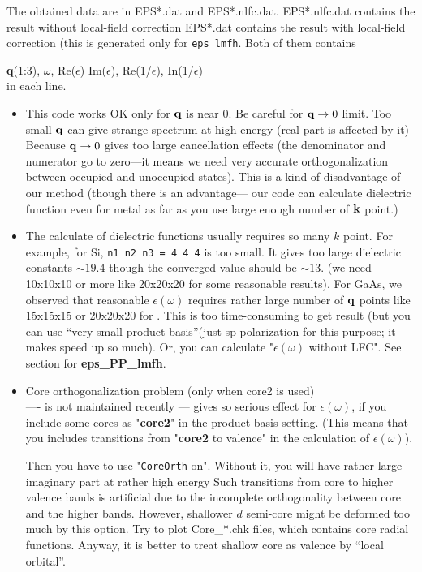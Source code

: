 \documentclass[a4paper,10pt,epsf,fleqn]{article}
\newcommand{\keyw}[1]{\fbox{\tt #1}}
\newcommand{\exe}[1]{{\bf #1}\index{#1}}
\newcommand{\io}[1]{{\sf  #1}\index{#1}}
\newcommand{\raw}[1]{{\tt #1}}
\begin{document}
The obtained data are in {\sf EPS*.dat} and {\sf EPS*.nlfc.dat}.
{\sf EPS*.nlfc.dat} contains the result without local-field correction
{\sf EPS*.dat} contains the result with local-field correction
(this is generated only for \verb#eps_lmfh#. Both of them contains

{\bf q}(1:3), $\omega$, Re($\epsilon$) Im($\epsilon$), Re(1/$\epsilon$), In(1/$\epsilon$)\\
in each line.

\begin{itemize}
 \item 
This code works OK only for ${\bf q}$ is near 0.
Be careful for ${\bf q} \to 0$ limit. Too small ${\bf q}$ can give strange
spectrum at high energy (real part is affected by it)\\

Because ${\bf q} \to 0$ gives too large cancellation effects
(the denominator and numerator go to zero---it means we need very accurate
orthogonalization between occupied and unoccupied states).
This is a kind of disadvantage of our method (though there is an advantage---
our code can calculate dielectric function even for metal 
as far as you use large enough number of ${\bf k}$ point.)

\item
The calculate of dielectric functions usually requires so many $k$ point. 
For example, for Si,  \verb#n1 n2 n3 = 4 4 4# is too small. 
It gives too large dielectric constants $\sim19.4$ though
the converged value should be $\sim13$. (we need 10x10x10 or more like 20x20x20
for some reasonable results).
For GaAs, we observed that reasonable $\epsilon(\omega)$ requires
rather large number of ${\bf q}$ points like 15x15x15 or 20x20x20
for \keyw{n1n2n3}. This is too time-consuming to get result
(but you can use ``very small product basis''(just sp polarization for this purpose;
it makes speed up so much). Or, you can calculate "$\epsilon(\omega)$ without LFC". 
See section for \exe{eps\_PP\_lmfh}.

\item Core orthogonalization problem (only when core2 is used)\\
----\keyw{CoreOrth} is not maintained recently ---
 \keyw{CoreOrth} gives so serious effect for 
$\epsilon(\omega)$, if you include some cores as "{\bf core2}"
in the product basis setting.
(This means that you includes transitions from "{\bf core2} to
valence" in the calculation of $\epsilon(\omega)$).

Then you have to use "\raw{CoreOrth} on". Without it,
you will have rather large imaginary part at rather high energy
Such transitions from core to higher valence bands
is artificial due to the incomplete orthogonality
between core and the higher bands.
However, shallower $d$ semi-core might be deformed too much
by this option. Try to plot \io{Core\_*.chk} files, 
which contains core radial functions. 
Anyway, it is better to treat shallow core as valence by ``local orbital''.
\end{itemize}
\end{document}
